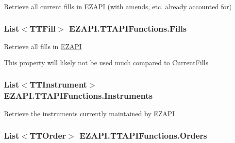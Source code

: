 Retrieve all current fills in \hyperlink{namespace_e_z_a_p_i}{E\-Z\-A\-P\-I} (with amends, etc. already accounted for) 

\hypertarget{class_e_z_a_p_i_1_1_t_t_a_p_i_functions_aaed71fb16d311ea46994643ff40eab8b}{
\subsubsection[{Fills}]{\setlength{\rightskip}{0pt plus 5cm}List$<${\bf T\-T\-Fill}$>$ E\-Z\-A\-P\-I.\-T\-T\-A\-P\-I\-Functions.\-Fills\hspace{0.3cm}{\ttfamily [get]}}}\label{class_e_z_a_p_i_1_1_t_t_a_p_i_functions_aaed71fb16d311ea46994643ff40eab8b}


Retrieve all fills in \hyperlink{namespace_e_z_a_p_i}{E\-Z\-A\-P\-I} 

This property will likely not be used much compared to Current\-Fills\hypertarget{class_e_z_a_p_i_1_1_t_t_a_p_i_functions_a41f8b0400d89627208cdffc8b9eeb7f5}{
\subsubsection[{Instruments}]{\setlength{\rightskip}{0pt plus 5cm}List$<${\bf T\-T\-Instrument}$>$ E\-Z\-A\-P\-I.\-T\-T\-A\-P\-I\-Functions.\-Instruments\hspace{0.3cm}{\ttfamily [get]}}}\label{class_e_z_a_p_i_1_1_t_t_a_p_i_functions_a41f8b0400d89627208cdffc8b9eeb7f5}


Retrieve the instruments currently maintained by \hyperlink{namespace_e_z_a_p_i}{E\-Z\-A\-P\-I} 

\hypertarget{class_e_z_a_p_i_1_1_t_t_a_p_i_functions_adad0bc014e4c2ab2908a9713823ec957}{
\subsubsection[{Orders}]{\setlength{\rightskip}{0pt plus 5cm}List$<${\bf T\-T\-Order}$>$ E\-Z\-A\-P\-I.\-T\-T\-A\-P\-I\-Functions.\-Orders\hspace{0.3cm}{\ttfamily [get]}}}\label{class_e_z_a_p_i_1_1_t_t_a_p_i_functions_adad0bc014e4c2ab2908a9713823ec957}


